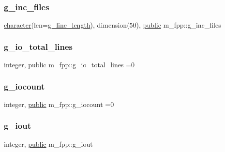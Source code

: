 \mbox{\label{namespacem__fpp_aaea061b982fcf2f3f3836c5411d931a1}} 
\subsubsection{\texorpdfstring{g\+\_\+inc\+\_\+files}{g\_inc\_files}}
{\footnotesize\ttfamily \hyperlink{option__stopwatch_83_8txt_abd4b21fbbd175834027b5224bfe97e66}{character}(len=\hyperlink{namespacem__fpp_ab93f8756cf248cf8db932573009d4664}{g\+\_\+line\+\_\+length}), dimension(50), \hyperlink{M__stopwatch_83_8txt_a2f74811300c361e53b430611a7d1769f}{public} m\+\_\+fpp\+::g\+\_\+inc\+\_\+files}

\mbox{\label{namespacem__fpp_ad1a67d3e00b9a0683ba0e10a42d0e588}} 
\subsubsection{\texorpdfstring{g\+\_\+io\+\_\+total\+\_\+lines}{g\_io\_total\_lines}}
{\footnotesize\ttfamily integer, \hyperlink{M__stopwatch_83_8txt_a2f74811300c361e53b430611a7d1769f}{public} m\+\_\+fpp\+::g\+\_\+io\+\_\+total\+\_\+lines =0}

\mbox{\label{namespacem__fpp_a4d1d9ddcc7abec412be3a3e6c99b19e1}} 
\subsubsection{\texorpdfstring{g\+\_\+iocount}{g\_iocount}}
{\footnotesize\ttfamily integer, \hyperlink{M__stopwatch_83_8txt_a2f74811300c361e53b430611a7d1769f}{public} m\+\_\+fpp\+::g\+\_\+iocount =0}

\mbox{\label{namespacem__fpp_a741d58e0caef7e3b1aa6e56796d6d705}} 
\subsubsection{\texorpdfstring{g\+\_\+iout}{g\_iout}}
{\footnotesize\ttfamily integer, \hyperlink{M__stopwatch_83_8txt_a2f74811300c361e53b430611a7d1769f}{public} m\+\_\+fpp\+::g\+\_\+iout}

